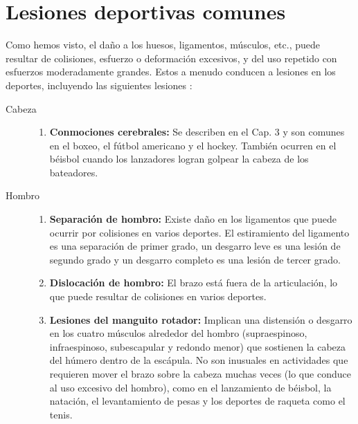 \documentclass[12pt]{book}
\begin{document}
\section{Lesiones deportivas comunes}

Como hemos visto, el daño a los huesos, ligamentos, músculos, etc., puede resultar de colisiones, esfuerzo o deformación excesivos, y del uso repetido con esfuerzos moderadamente grandes. Estos a menudo conducen a lesiones en los deportes, incluyendo las siguientes lesiones \cite{36,48}:

\begin{description}
  \item[Cabeza] \hfill
  \begin{enumerate}
    \item \textbf{Conmociones cerebrales:} Se describen en el Cap. 3 y son comunes en el boxeo, el fútbol americano y el hockey. También ocurren en el béisbol cuando los lanzadores logran golpear la cabeza de los bateadores.
  \end{enumerate}
  
  \item[Hombro] \hfill
  \begin{enumerate}
    \item \textbf{Separación de hombro:} Existe daño en los ligamentos que puede ocurrir por colisiones en varios deportes. El estiramiento del ligamento es una separación de primer grado, un desgarro leve es una lesión de segundo grado y un desgarro completo es una lesión de tercer grado.
    \item \textbf{Dislocación de hombro:} El brazo está fuera de la articulación, lo que puede resultar de colisiones en varios deportes.
    \item \textbf{Lesiones del manguito rotador:} Implican una distensión o desgarro en los cuatro músculos alrededor del hombro (supraespinoso, infraespinoso, subescapular y redondo menor) que sostienen la cabeza del húmero dentro de la escápula. No son inusuales en actividades que requieren mover el brazo sobre la cabeza muchas veces (lo que conduce al uso excesivo del hombro), como en el lanzamiento de béisbol, la natación, el levantamiento de pesas y los deportes de raqueta como el tenis.
  \end{enumerate}


\end{description}
\end{document}
